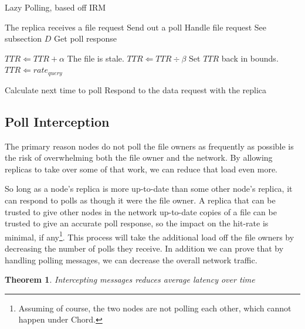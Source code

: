 \documentclass[10pt, conference, compsocconf, letterpaper]{IEEEtran} %
\begin{document}
\begin{algorithm}                      %
\caption{Lazy Polling, based off IRM \cite{IRM}}          %
\label{lazy}                           %
\begin{algorithmic}[1]                    %
\State The replica receives a file request
	\State Send out a poll
	\State Handle file request \Comment See subsection $D$
	\State Get poll response
	
		\State $TTR \Leftarrow TTR + \alpha$
	\Else \Comment The file is stale.
		\State $TTR \Leftarrow TTR \div \beta$
	\EndIf
		\State Set $TTR$ back in bounds.
	\EndIf
		\State $TTR \Leftarrow rate_{query}$  
	\EndIf
	
	\State Calculate next time to poll
\Else
	\State Respond to the data request with the replica
\EndIf

\end{algorithmic}
\end{algorithm}



\subsection{Poll Interception}
The primary reason nodes do not poll the file owners as frequently as possible is the risk of overwhelming both the file owner and the network.  By allowing replicas to take over some of that work, we can reduce that load even more.

 So long as a node's replica is more up-to-date than some other node's replica, it can respond to polls as though it were the file owner.  A replica that can be trusted to give other nodes in the network up-to-date copies of a file can be trusted to give an accurate poll response, so the impact on the hit-rate is minimal, if any\footnote{Assuming of course, the two nodes are not polling each other, which cannot happen under Chord.}.  This process will take the additional load off the file owners by decreasing the number of polls they receive.  In addition we can prove that by handling polling messages, we can decrease the overall network traffic.
 

\newtheorem*{Theorem}{Theorem}

\begin{Theorem}
Intercepting messages reduces average latency over time
\end{Theorem}
\end{document}
